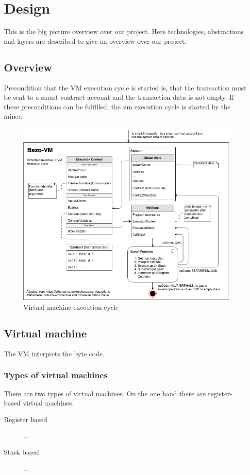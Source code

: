 \chapter{Design}
\thispagestyle{main} %
This is the big picture overview over our project. Here technologies, abstractions and layers are described to give an overview over our project.

\section{Overview}
Precondition that the VM execution cycle is started is, that the transaction must be sent to a smart contract account and the transaction data is not empty. If these preconditions can be fulfilled, the vm execution cycle is started by the miner.

\begin{figure}[H]
	\begin{center}
	\includegraphics[width=\textwidth]{./images/execution-cycle}
	\caption{Virtual machine execution cycle}
	\label{vmexecutioncycle}
	\end{center}
\end{figure}

\section{Virtual machine}
The VM interprets the byte code.

\subsection{Types of virtual machines}
There are two types of virtual machines. On the one hand there are register-based virtual machines.
\begin{description}
  \item[Register based] ...
  \item[Stack based] ...
\end{description}

